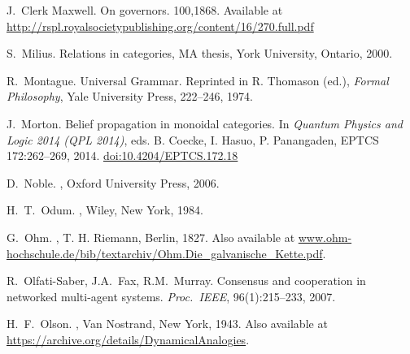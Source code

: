 \begin{thebibliography}{RSW00}
    J.\ Clerk Maxwell. 
    \newblock On governors.
     { 100},1868. 
    \newblock Available at \href{http://rspl.royalsocietypublishing.org/content/16/270.full.pdf}{http://rspl.royalsocietypublishing.org/content/16/270.full.pdf}
    
    S.\ Milius.
    \newblock Relations in categories, MA thesis, York University,
    Ontario, 2000.

    R.\ Montague.
    \newblock Universal Grammar.
    \newblock Reprinted in R. Thomason (ed.), {\em Formal Philosophy}, Yale
    University Press, 222--246, 1974. 

    J.\ Morton.
    \newblock Belief propagation in monoidal categories. 
    \newblock In {\em Quantum Physics and Logic 2014 (QPL 2014)}, eds. B.
    Coecke, I. Hasuo, P. Panangaden, EPTCS 172:262--269, 2014.  
    \newblock
    \href{http://dx.doi.org/10.4204/EPTCS.172.18}{doi:10.4204/EPTCS.172.18 }
    
    D.\ Noble.
    , Oxford
    University Press, 2006.


    H.\ T.\ Odum.
    , Wiley, New York, 1984.

    G.\ Ohm.
    ,
    T. H. Riemann, Berlin, 1827.
    \newblock Also available at
    \href{http://www.ohm-hochschule.de/bib/textarchiv/Ohm.Die_galvanische_Kette.pdf}{www.ohm-hochschule.de/bib/textarchiv/Ohm.Die\_galvanische\_Kette.pdf}.

    R.\ Olfati-Saber, J.A.\ Fax, R.M.\ Murray.
    \newblock Consensus and cooperation in networked multi-agent systems.
    \newblock \emph{Proc.\ IEEE}, 96(1):215--233, 2007.

    H.\ F.\ Olson.
    , Van
    Nostrand, New York, 1943.
    \newblock Also available at 
    \href{https://archive.org/details/DynamicalAnalogies}
    {https://archive.org/details/DynamicalAnalogies}.


\end{thebibliography}
